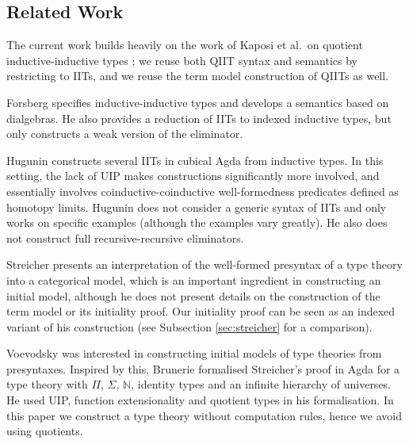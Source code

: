 \documentclass[a4paper,UKenglish,cleveref, autoref]{lipics-v2019}
\begin{document}


\subsection{Related Work}

The current work builds heavily on the work of Kaposi et al.\ on quotient
inductive-inductive types \cite{Kaposi:2019:CQI:3302515.3290315}; we reuse both
QIIT syntax and semantics by restricting to IITs, and we reuse the term model
construction of QIITs as well.

Forsberg \cite{forsberg-phd} specifies inductive-inductive types and develops a
semantics based on dialgebras. He also provides a reduction of IITs to indexed
inductive types, but only constructs a weak version of the eliminator.

Hugunin \cite{jasper} constructs several IITs in cubical Agda from inductive
types. In this setting, the lack of UIP makes constructions significantly more
involved, and essentially involves coinductive-coinductive well-formedness
predicates defined as homotopy limits. Hugunin does not consider a generic
syntax of IITs and only works on specific examples (although the examples vary
greatly). He also does not construct full recursive-recursive eliminators.

Streicher \cite{streichersemantics} presents an interpretation of the well-formed
presyntax of a type theory into a categorical model, which is an important
ingredient in constructing an initial model, although he does not present
details on the construction of the term model or its initiality proof. Our initiality proof can be seen as an indexed variant of his construction (see Subsection \ref{sec:streicher} for a comparison).

Voevodsky was interested in constructing initial models of type
theories from presyntaxes. Inspired by this, Brunerie \cite{brunerie}
formalised Streicher's proof in Agda for a type theory with $\Pi$,
$\Sigma$, $\mathbb{N}$, identity types and an infinite hierarchy of
universes. He used UIP, function extensionality and quotient types in
his formalisation. In this paper we construct a type theory without
computation rules, hence we avoid using quotients.
\end{document}
